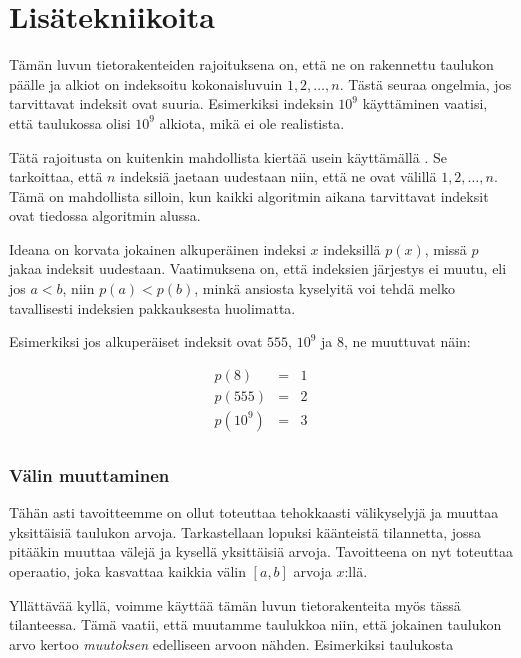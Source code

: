 \section{Lisätekniikoita}

Tämän luvun tietorakenteiden
rajoituksena on,
että ne on rakennettu taulukon päälle
ja alkiot on indeksoitu
kokonaisluvuin $1,2,\ldots,n$.
Tästä seuraa ongelmia,
jos tarvittavat indeksit ovat suuria.
Esimerkiksi indeksin $10^9$ käyttäminen
vaatisi, että taulukossa olisi $10^9$ alkiota,
mikä ei ole realistista.


Tätä rajoitusta on kuitenkin mahdollista
kiertää usein käyttämällä .
Se tarkoittaa, että $n$ indeksiä jaetaan
uudestaan niin, että ne ovat välillä $1,2,\ldots,n$.
Tämä on mahdollista silloin, kun kaikki
algoritmin aikana tarvittavat indeksit
ovat tiedossa algoritmin alussa.

Ideana on korvata jokainen alkuperäinen
indeksi $x$ indeksillä $p(x)$,
missä $p$ jakaa indeksit uudestaan.
Vaatimuksena on, että indeksien järjestys
ei muutu, eli jos $a<b$, niin $p(a)<p(b)$,
minkä ansiosta kyselyitä voi tehdä
melko tavallisesti indeksien pakkauksesta huolimatta.

Esimerkiksi jos alkuperäiset indeksit ovat
$555$, $10^9$ ja $8$, ne muuttuvat näin:

\[
\begin{array}{lcl}
p(8) & = & 1 \\
p(555) & = & 2 \\
p(10^9) & = & 3 \\
\end{array}
\]

\subsubsection{Välin muuttaminen}

Tähän asti tavoitteemme on ollut toteuttaa
tehokkaasti välikyselyjä ja muuttaa yksittäisiä
taulukon arvoja.
Tarkastellaan lopuksi käänteistä tilannetta,
jossa pitääkin muuttaa välejä ja 
kysellä yksittäisiä arvoja.
Tavoitteena on nyt toteuttaa operaatio,
joka kasvattaa kaikkia välin $[a,b]$ arvoja $x$:llä.

Yllättävää kyllä,
voimme käyttää tämän luvun tietorakenteita myös tässä tilanteessa.
Tämä vaatii, että muutamme taulukkoa niin,
että jokainen taulukon arvo kertoo \textit{muutoksen}
edelliseen arvoon nähden.
Esimerkiksi taulukosta

